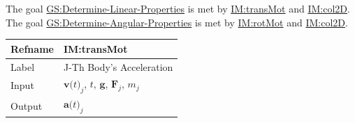 \documentclass[12pt]{article}
\begin{document}
The goal \hyperref[linearGS]{GS:Determine-Linear-Properties} is met by \hyperref[IM:transMot]{IM:transMot} and \hyperref[IM:col2D]{IM:col2D}. The goal \hyperref[angularGS]{GS:Determine-Angular-Properties} is met by \hyperref[IM:rotMot]{IM:rotMot} and \hyperref[IM:col2D]{IM:col2D}.

\medskip
\noindent
\begin{minipage}{\textwidth}
\begin{tabular}{>{\raggedright}p{}>{\raggedright\arraybackslash}p{}}
\toprule \textbf{Refname} & \textbf{IM:transMot}
\label{IM:transMot}
\\ \midrule
Label & J-Th Body's Acceleration
        
\\ \midrule
Input & ${\symbf{v}\text{(}t\text{)}_{j}}$, $t$, $\symbf{g}$, ${\symbf{F}_{j}}$, ${m_{j}}$
        
\\ \midrule
Output & ${\symbf{a}\text{(}t\text{)}_{j}}$
         

\end{tabular}
\end{minipage}
\end{document}

